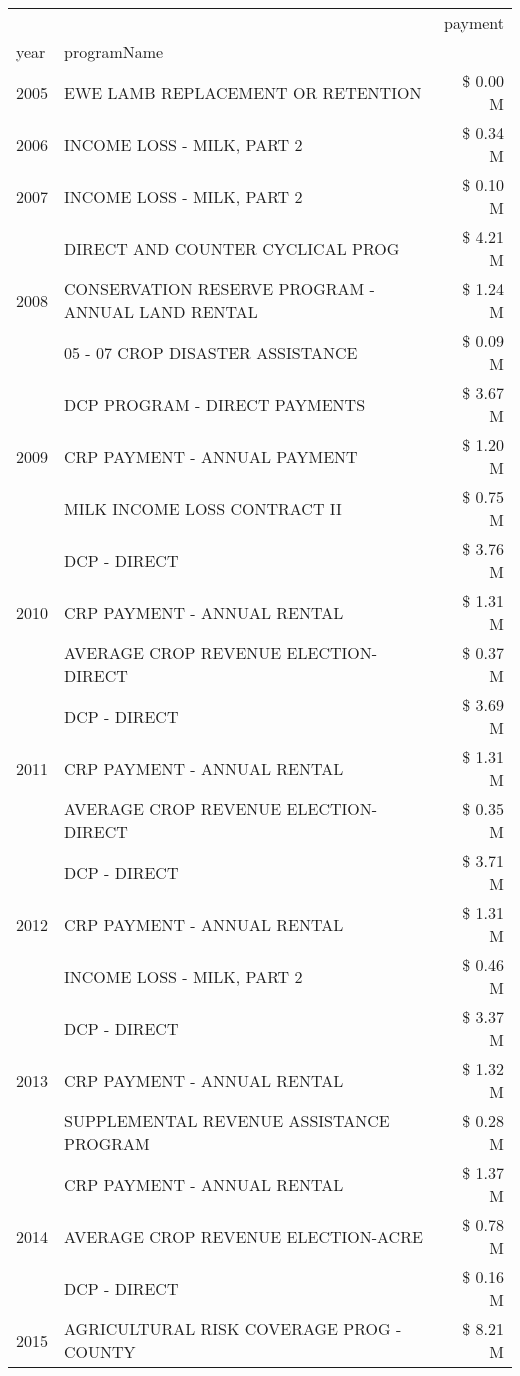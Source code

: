 \begin{tabular}{llr}
\toprule
 &  & payment \\
year & programName &  \\
\midrule
2005 & EWE LAMB REPLACEMENT OR RETENTION & \$ 0.00 M \\
\cline{1-3}
2006 & INCOME LOSS - MILK, PART 2 & \$ 0.34 M \\
\cline{1-3}
2007 & INCOME LOSS - MILK, PART 2 & \$ 0.10 M \\
\cline{1-3}
\multirow[t]{3}{*}{2008} & DIRECT AND COUNTER CYCLICAL PROG & \$ 4.21 M \\
 & CONSERVATION RESERVE PROGRAM - ANNUAL LAND RENTAL & \$ 1.24 M \\
 & 05 - 07 CROP DISASTER ASSISTANCE & \$ 0.09 M \\
\cline{1-3}
\multirow[t]{3}{*}{2009} & DCP PROGRAM - DIRECT PAYMENTS & \$ 3.67 M \\
 & CRP PAYMENT - ANNUAL PAYMENT & \$ 1.20 M \\
 & MILK INCOME LOSS CONTRACT II & \$ 0.75 M \\
\cline{1-3}
\multirow[t]{3}{*}{2010} & DCP - DIRECT & \$ 3.76 M \\
 & CRP PAYMENT - ANNUAL RENTAL & \$ 1.31 M \\
 & AVERAGE CROP REVENUE ELECTION-DIRECT & \$ 0.37 M \\
\cline{1-3}
\multirow[t]{3}{*}{2011} & DCP - DIRECT & \$ 3.69 M \\
 & CRP PAYMENT - ANNUAL RENTAL & \$ 1.31 M \\
 & AVERAGE CROP REVENUE ELECTION-DIRECT & \$ 0.35 M \\
\cline{1-3}
\multirow[t]{3}{*}{2012} & DCP - DIRECT & \$ 3.71 M \\
 & CRP PAYMENT - ANNUAL RENTAL & \$ 1.31 M \\
 & INCOME LOSS - MILK, PART 2 & \$ 0.46 M \\
\cline{1-3}
\multirow[t]{3}{*}{2013} & DCP - DIRECT & \$ 3.37 M \\
 & CRP PAYMENT - ANNUAL RENTAL & \$ 1.32 M \\
 & SUPPLEMENTAL REVENUE ASSISTANCE PROGRAM & \$ 0.28 M \\
\cline{1-3}
\multirow[t]{3}{*}{2014} & CRP PAYMENT - ANNUAL RENTAL & \$ 1.37 M \\
 & AVERAGE CROP REVENUE ELECTION-ACRE & \$ 0.78 M \\
 & DCP - DIRECT & \$ 0.16 M \\
\cline{1-3}
\multirow[t]{3}{*}{2015} & AGRICULTURAL RISK COVERAGE PROG - COUNTY & \$ 8.21 M \\

\end{tabular}
